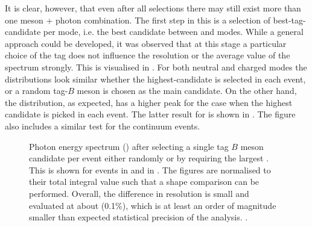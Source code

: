 It is clear, however, that even after all selections there may still exist more than one \B meson + photon combination.
The first step in this is a selection of best-tag-candidate per \FEI mode, i.e. the best candidate between \feiBp and \feiBz modes.
While a general approach could be developed, it was observed that at this stage a particular choice of the tag does not influence the resolution or the average value of the spectrum strongly.
This is visualised in .
For both neutral and charged \BtoXsgamma modes the distributions look similar whether the highest-\feiProb candidate is selected in each event, or a random tag-$B$ meson is chosen as the main candidate.
On the other hand, the \Mbc distribution, as expected, has a higher peak for the case when the highest \feiProb candidate is picked in each event.
The latter result for \BtoXsgamma is shown in .
The figure also includes a similar \Mbc test for the continuum events.

\begin{figure}[htbp!]
    \caption{\label{fig:same_mode_best_tag_selection}Photon energy spectrum () after selecting a single tag $B$ meson candidate per event either randomly or by requiring the largest \feiProb.
    This is shown for \BptoXsgamma events in  
    and \BztoXsgamma in .
    The figures are normalised to their total integral value such that a shape comparison can be performed.
    Overall, the difference in resolution is small and evaluated at about \order(0.1\%), which is at least an order of magnitude smaller than expected statistical precision of the analysis.
    .
    }
\end{figure}

